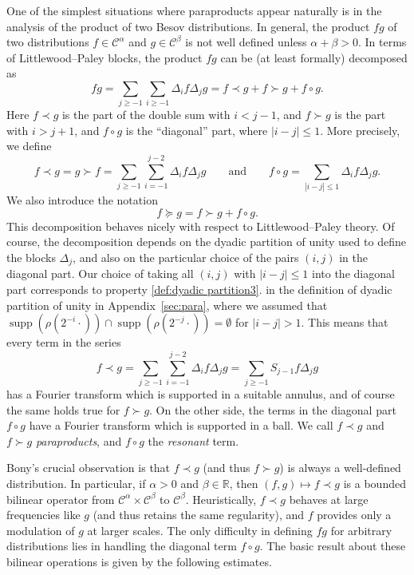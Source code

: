 \documentclass[11pt,a4paper]{article}
\newcommand{\cdummy}{\cdot}
\newcommand{\tmop}[1]{\ensuremath{\operatorname{#1}}}
\newcommand{\tmtextit}[1]{{\itshape{#1}}}
\theoremstyle{remark}
\newcommand{\CC}{\ensuremath{\mathscr{C}}}
\begin{document}
 One of the simplest situations where paraproducts appear naturally is in the analysis of the product of two Besov distributions. 
In general, the product $f g$ of two distributions $f \in \CC^{\alpha}$ and $g \in \CC^{\beta}$ is not well defined unless $\alpha + \beta >0$. In terms of Littlewood--Paley blocks, the product $f g$ can be (at least formally) decomposed as
\[
   fg= \sum_{j \geqslant -1} \sum_{i \geqslant -1} \Delta_{i} f \Delta_{j} g=f \prec g+f \succ g+f \circ g.
\]
Here $f \prec g$ is the part of the double sum with $i<j-1$, and $f \succ g$ is the part with $i>j+1$, and $f \circ g$ is the ``diagonal'' part, where $|i-j | \leqslant 1$. More precisely, we define
\[
   f \prec g= g\succ f = \sum_{j \geqslant -1} \sum_{i=-1}^{j-2} \Delta_{i} f \Delta_{j} g \qquad \text{and}\qquad
   f \circ g= \sum_{| i-j | \leqslant 1} \Delta_{i} f \Delta_{j} g.
\]
We also introduce the notation
\[
   f \succcurlyeq g=f \succ g+f \circ g.
\]
This decomposition  behaves nicely with respect to Littlewood--Paley theory. Of course, the decomposition depends on the dyadic partition of unity used to define the blocks $\Delta_{j}$, and also on the particular choice of the pairs $( i,j )$ in the diagonal part. Our choice of taking all $(i,j)$ with $| i-j| \leqslant 1$ into the diagonal part corresponds to property \ref{def:dyadic partition3}. in the definition of dyadic partition of unity in Appendix~\ref{sec:para},  where we assumed that $\tmop{supp} ( \rho ( 2^{-i} \cdummy ) ) \cap \tmop{supp} ( \rho ( 2^{-j} \cdummy ) ) = \emptyset$ for $| i-j | >1$. This means that every term in the series
\[
   f \prec g = \sum_{j \geqslant -1} \sum_{i=-1}^{j-2} \Delta_{i} f \Delta_{j} g= \sum_{j \geqslant -1} S_{j-1} f \Delta_{j} g
\]
has a Fourier transform which is supported in a suitable annulus, and of course the same holds true for $f \succ g$. On the other side, the terms in the diagonal part $f \circ g$ have a Fourier transform which is supported in a ball. We call $f \prec g$ and $f \succ g$ \tmtextit{paraproducts}, and $f \circ g$ the \tmtextit{resonant} term.

Bony's crucial observation is that $f \prec g$ (and thus $f \succ g$) is always a well-defined distribution. In particular, if $\alpha >0$ and $\beta \in \mathbb{R}$, then $( f,g ) \mapsto f \prec g$ is a bounded bilinear operator from $\CC^{\alpha} \times \CC^{\beta}$ to $\CC^{\beta}$. Heuristically, $f \prec g$ behaves at large frequencies like $g$ (and thus retains the same regularity), and $f$ provides only a modulation of $g$ at larger scales. The only difficulty in defining $fg$ for arbitrary distributions lies in handling the diagonal term $f \circ g$. The basic result about these bilinear operations is given by the following estimates.
\end{document}

